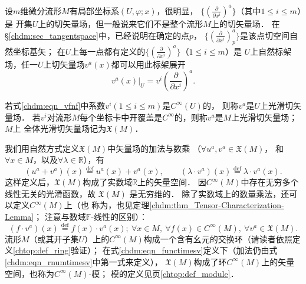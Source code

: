 设$m$维微分流形$M$有局部坐标系$(U,\varphi;x)$，很明显，
$\{(\frac{\partial }{\partial x^i})^a\}$（其中$1\leqslant i \leqslant m$）是
开集$U$上的切矢量场，但一般说来它们不是整个流形$M$上的切矢量场．
在\S\ref{chdm:sec_tangentspace}中，已经说明在确定的点$p$，
$\{(\frac{\partial }{\partial x^i})^a_p\}$是该点切空间自然坐标基矢；
在$U$上每一点都有定义的$\{(\frac{\partial }{\partial x^i})^a\}$（$1\leqslant i \leqslant m$）是
$U$上{\heiti 自然标架场}，任一$U$上切矢量场$v^a(x)$都可以用此标架展开
\begin{equation}\label{chdm:eqn_vfnf}
    v^a(x)|_U = v^i \left(\frac{\partial }{\partial x^i}\right)^a .
\end{equation}


\begin{definition}
    若式\eqref{chdm:eqn_vfnf}中系数$v^i(1\leqslant i \leqslant m)$是$C^\infty(U)$的，
    则称$v^a$是$U$上{\heiti 光滑切矢量场}．
    若$v^i$对流形$M$每个坐标卡中开覆盖是$C^\infty$的，则称$v^a$是$M$上{\heiti 光滑切矢量场}；$M$上
    全体光滑切矢量场记为$\mathfrak{X}(M)$．
\end{definition}

我们用自然方式定义$\mathfrak{X}(M)$中矢量场的加法与数乘
（$\forall u^a,v^a \in \mathfrak{X}(M)$，
和$\forall x\in M$，以及$\forall \lambda \in \mathbb{R}$），有
\begin{equation}\label{chdm:eqn_rnumtimesv}
    (u^a+v^a)(x) \overset{\mathrm {def}}{=} u^a(x) + v^a(x), \qquad 
    (\lambda \cdot v^a)(x) \overset{\mathrm {def}}{=} \lambda\cdot v^a(x).
\end{equation}
这样定义后，$\mathfrak{X}(M)$构成了实数域$\mathbb{R}$上的矢量空间．
因$C^\infty(M)$中存在无穷多个线性无关的光滑函数，故 $\mathfrak X(M)$ 是无穷维的．
除了实数域上的数量乘法，还可以定义$C^\infty(M)$上（也
称为，也见定理\ref{chdm:thm_Tensor-Characterization-Lemma}；
注意与数域$\mathbb{F}$-线性的区别）：
\begin{equation}\label{chdm:eqn_functimesv}
    (f \cdot v^a)(x) \overset{\mathrm {def}}{=} f(x)\cdot v^a(x); \
    \forall x\in M, \ \forall f(x) \in C^\infty(M), \ \forall v^a \in \mathfrak{X}(M) .
\end{equation}
流形$M$（或其开子集$U$）上的$C^\infty(M)$构成一个含有幺元的交换环（请读者依照定义\ref{chtop:def_ring}验证）；
在式\eqref{chdm:eqn_functimesv}定义下（加法仍由式\eqref{chdm:eqn_rnumtimesv}中第一式来定义），
$\mathfrak{X}(M)$构成了环$C^\infty(M)$上的矢量空间，也称为$C^\infty(M)$-模；
模的定义见\pageref{chtop:def_module}页\ref{chtop:def_module}．

